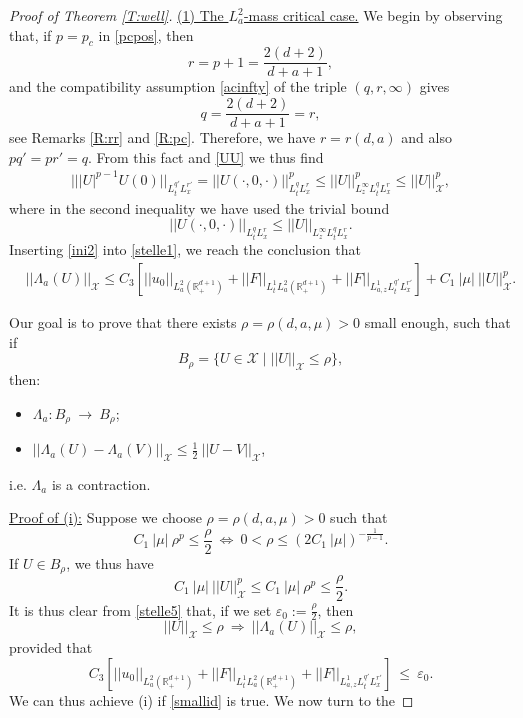 \documentclass[11pt,letter]{amsart}
\def \RN {\mathbb{R}_+^{d+1}}
\numberwithin{equation}{section}
\newcommand{\ve}{\varepsilon}
\newcommand{\Xs}{\mathcal X}
\numberwithin{equation}{section}
\begin{document}
\begin{proof}[Proof of Theorem \ref{T:well}]
\noindent \underline{(1) The $L^2_a$-mass critical case.} We begin by observing that, if $p = p_c$ in \eqref{pcpos}, then 
\[
r = p+1 = \frac{2(d+2)}{d+a+1},
\]
and the compatibility assumption \eqref{acinfty} of the triple $(q,r,\infty)$ gives
\[
q = \frac{2(d+2)}{d+a+1} = r,
\]
see Remarks \ref{R:rr} and \ref{R:pc}.
Therefore, we have $r = r(d,a)$ and also $pq' = p r' = q$. From this fact and \eqref{UU} we thus find
\begin{align}\label{ini2}
|||U|^{p-1}U(0)||_{L^{q'}_t L^{r'}_x} = ||U(\cdot,0,\cdot)||^p_{L^{q}_t L^{r}_x} \le ||U||^p_{L^\infty_z L^{q}_t L^{r}_x }\le ||U||_{\Xs}^p,
\end{align}
where in the second inequality we have used the trivial bound
\begin{equation}\label{triv}
||U(\cdot,0,\cdot)||_{L^{q}_t L^{r}_x} \le ||U||_{L^\infty_z L^{q}_t L^{r}_x }.
\end{equation} 
Inserting \eqref{ini2} into \eqref{stelle1}, we reach the conclusion that 
\begin{align}\label{stelle5}
&  ||\Lambda_a(U)||_{\Xs} \le C_3 \left[||u_0||_{L^2_a(\RN)} + ||F||_{L^1_t L^2_a(\RN)} + ||F||_{L^1_{a,z} L^{q'}_t L^{r'}_x }\right] + C_1\ |\mu|\ ||U||_{\Xs}^p.
\end{align}


Our goal is to prove that there exists $\rho = \rho(d,a,\mu)>0$ small enough, such that if 
\[
B_\rho = \{U\in \Xs\mid ||U||_{\Xs}\le \rho\},
\]
then:
\begin{itemize}
\item[(i)] $\Lambda_a : B_\rho\ \longrightarrow\ B_\rho$;
\\
\item[(ii)] $||\Lambda_a(U) -\Lambda_a(V)||_{\Xs} \le \frac 12\ ||U-V||_{\Xs}$,
\end{itemize}
i.e. $\Lambda_a$ is a contraction. 

\vskip 0.2in

\noindent \underline{Proof of (i):} Suppose we choose $\rho = \rho(d,a,\mu)>0$ such that
\begin{equation}\label{rho}
C_1\ |\mu|\ \rho^p \le \frac{\rho}2\ \Longleftrightarrow\ 0< \rho \le (2 C_1\ |\mu|)^{-\frac{1}{p-1}}.  
\end{equation}
If $U\in B_\rho$, we thus have 
\[
C_1\ |\mu|\ ||U||_{\Xs}^p \le C_1\ |\mu|\ \rho^p \le \frac{\rho}2.
\]
It is thus clear from \eqref{stelle5} that, if we set $\ve_0 := \frac{\rho}2$, then 
\[
||U||_{\Xs}\le \rho\ \Longrightarrow\ ||\Lambda_a(U)||_{\Xs}\le \rho,
\]
provided that
\begin{equation}\label{smallid}
C_3 \left[||u_0||_{L^2_a(\RN)} + ||F||_{L^1_t L^2_a(\RN)} + ||F||_{L^1_{a,z} L^{q'}_t L^{r'}_x }\right]\  \le\ \ve_0.
\end{equation}
We can thus achieve (i) if \eqref{smallid} is true. We now turn to the 


\end{proof}
\end{document}
